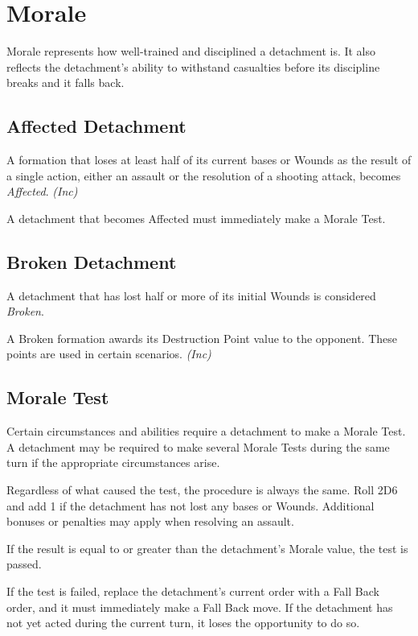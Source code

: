 \section{Morale}

Morale represents how well-trained and disciplined a detachment is. It also reflects the detachment's ability to withstand casualties before its discipline breaks and it falls back.

\subsection{Affected Detachment}

A formation that loses at least half of its current bases or Wounds as the result of a single action, either an assault or the resolution of a shooting attack, becomes \textit{Affected}. \textit{(Inc)}

A detachment that becomes Affected must immediately make a Morale Test.

\subsection{Broken Detachment}

A detachment that has lost half or more of its initial Wounds is considered \textit{Broken}.

A Broken formation awards its Destruction Point value to the opponent. These points are used in certain scenarios. \textit{(Inc)}

\subsection{Morale Test}

Certain circumstances and abilities require a detachment to make a Morale Test. A detachment may be required to make several Morale Tests during the same turn if the appropriate circumstances arise.

Regardless of what caused the test, the procedure is always the same. Roll 2D6 and add 1 if the detachment has not lost any bases or Wounds. Additional bonuses or penalties may apply when resolving an assault.

If the result is equal to or greater than the detachment's Morale value, the test is passed.

If the test is failed, replace the detachment's current order with a Fall Back order, and it must immediately make a Fall Back move. If the detachment has not yet acted during the current turn, it loses the opportunity to do so.

